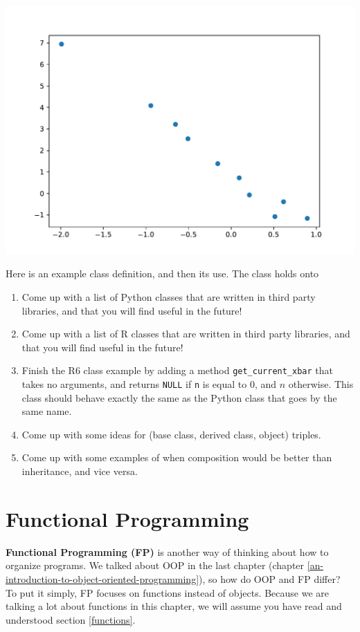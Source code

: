 \documentclass[
  12pt,
]{krantz}
\begin{document}
\includegraphics{r_and_python_book_files/figure-latex/unnamed-chunk-206-1.pdf}

Here is an example class definition, and then its use. The class holds onto

\begin{enumerate}
\def\labelenumi{\arabic{enumi}.}
\setcounter{enumi}{2}
\item
  Come up with a list of Python classes that are written in third party libraries, and that you will find useful in the future!
\item
  Come up with a list of R classes that are written in third party libraries, and that you will find useful in the future!
\item
  Finish the R6 class example by adding a method \texttt{get\_current\_xbar} that takes no arguments, and returns \texttt{NULL} if \texttt{n} is equal to \(0\), and \(n\) otherwise. This class should behave exactly the same as the Python class that goes by the same name.
\item
  Come up with some ideas for (base class, derived class, object) triples.
\item
  Come up with some examples of when composition would be better than inheritance, and vice versa.
\end{enumerate}

\hypertarget{functional-programming}{%
\chapter{Functional Programming}\label{functional-programming}}

\textbf{Functional Programming (FP)} is another way of thinking about how to organize programs. We talked about OOP in the last chapter (chapter \ref{an-introduction-to-object-oriented-programming}), so how do OOP and FP differ? To put it simply, FP focuses on functions instead of objects. Because we are talking a lot about functions in this chapter, we will assume you have read and understood section \ref{functions}.
\end{document}
